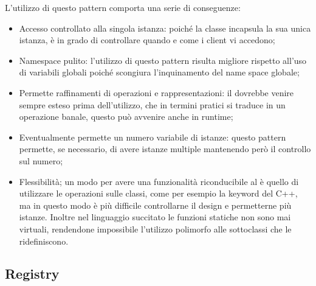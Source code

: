 	L'utilizzo di questo pattern comporta una serie di conseguenze:
	\begin{itemize}
		\item Accesso controllato alla singola istanza: poiché la classe  incapsula la sua unica istanza, è in grado di controllare quando e come i client vi accedono;
		\item Namespace pulito: l'utilizzo di questo pattern risulta migliore rispetto all'uso di variabili globali poiché scongiura l'inquinamento del name space globale;
		\item Permette raffinamenti di operazioni e rappresentazioni: il  dovrebbe venire sempre esteso prima dell'utilizzo, che in termini pratici si traduce in un operazione banale, questo può avvenire anche in runtime;
		\item Eventualmente permette un numero variabile di istanze: questo pattern permette, se necessario, di avere istanze multiple mantenendo però il controllo sul numero;
		\item Flessibilità; un modo per avere una funzionalità riconducibile al  è quello di utilizzare le operazioni sulle classi, come per esempio la keyword  del C++, ma in questo modo è più difficile controllarne il design e permetterne più istanze. Inoltre nel linguaggio succitato le funzioni statiche non sono mai virtuali, rendendone impossibile l'utilizzo polimorfo alle sottoclassi che le ridefiniscono.
	\end{itemize}
	
	\subsection{Registry} %